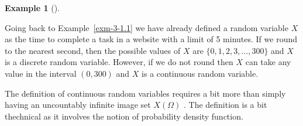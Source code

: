 \documentclass[
  letterpaper,
  DIV=11,
  numbers=noendperiod]{scrreport}
\theoremstyle{definition}
\newtheorem{example}{Example}[chapter]
\theoremstyle{plain}
\theoremstyle{plain}
\theoremstyle{definition}
\theoremstyle{remark}
\begin{document}
\begin{tcolorbox}[enhanced jigsaw, opacitybacktitle=0.6, bottomtitle=1mm, opacityback=0, toprule=.15mm, colbacktitle=quarto-callout-note-color!10!white, colback=white, left=2mm, title={Continuous vs Discrete Random Variables}, breakable, rightrule=.15mm, leftrule=.75mm, titlerule=0mm, colframe=quarto-callout-note-color-frame, arc=.35mm, coltitle=black, toptitle=1mm, bottomrule=.15mm]

\begin{example}[]\protect\hypertarget{exm-time-website-random-variable}{}\label{exm-time-website-random-variable}

Going back to Example~\ref{exm-3-1.1} we have already defined a random
variable \(X\) as the time to complete a task in a website with a limit
of 5 minutes. If we round to the nearest second, then the possible
values of \(X\) are \(\{0,1, 2, 3, \ldots, 300\}\) and \(X\) is a
discrete random variable. However, if we do not round then \(X\) can
take any value in the interval \((0,300)\) and \(X\) is a continuous
random variable.

\end{example}

\end{tcolorbox}

The definition of continuous random variables requires a bit more than
simply having an uncountably infinite image set \(X(\Omega)\) . The
definition is a bit thechnical as it involves the notion of probability
density function.
\end{document}
